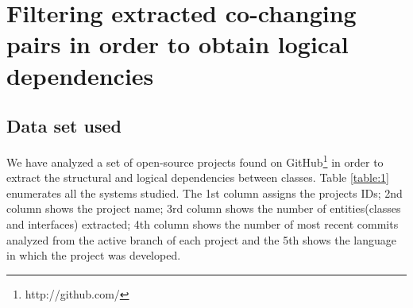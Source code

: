 \documentclass[12pt, a4paper, twoside]{report}
\begin{document}
\chapter {Filtering extracted co-changing pairs in order to obtain logical dependencies}

\section{Data set used}
\label{sec:dataset}
We have analyzed a set of open-source projects found on GitHub\footnote{http://github.com/} \cite{Kalliamvakou2016} in order to extract the structural and logical dependencies between classes. Table \ref{table:1} enumerates all the systems studied. The 1st column assigns the projects IDs; 2nd column shows the project name; 3rd column shows the number of entities(classes and interfaces) extracted; 4th column shows the number of most recent commits analyzed from the active branch of each project and the 5th shows the language in which the project was developed.
\end{document}
